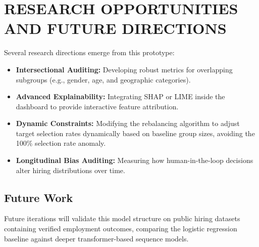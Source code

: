 \documentclass[sigconf]{acmart}
\begin{document}
\section{RESEARCH OPPORTUNITIES AND FUTURE DIRECTIONS}
Several research directions emerge from this prototype:
\begin{itemize}
    \item \textbf{Intersectional Auditing:} Developing robust metrics for overlapping subgroups (e.g., gender, age, and geographic categories).
    \item \textbf{Advanced Explainability:} Integrating SHAP or LIME inside the dashboard to provide interactive feature attribution.
    \item \textbf{Dynamic Constraints:} Modifying the rebalancing algorithm to adjust target selection rates dynamically based on baseline group sizes, avoiding the 100\% selection rate anomaly.
    \item \textbf{Longitudinal Bias Auditing:} Measuring how human-in-the-loop decisions alter hiring distributions over time.
\end{itemize}

\subsection*{Future Work}
Future iterations will validate this model structure on public hiring datasets containing verified employment outcomes, comparing the logistic regression baseline against deeper transformer-based sequence models.
\end{document}
